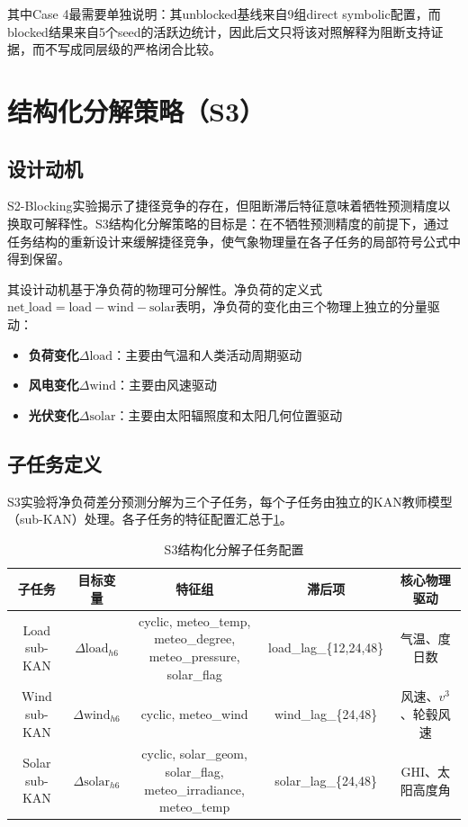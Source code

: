 其中Case 4最需要单独说明：其unblocked基线来自9组direct symbolic配置，而blocked结果来自5个seed的活跃边统计，因此后文只将该对照解释为阻断支持证据，而不写成同层级的严格闭合比较。

\section{结构化分解策略（S3）}
\label{sec:s3-design}

\subsection{设计动机}

S2-Blocking实验揭示了捷径竞争的存在，但阻断滞后特征意味着牺牲预测精度以换取可解释性。S3结构化分解策略的目标是：在不牺牲预测精度的前提下，通过任务结构的重新设计来缓解捷径竞争，使气象物理量在各子任务的局部符号公式中得到保留。

其设计动机基于净负荷的物理可分解性。净负荷的定义式$\text{net\_load} = \text{load} - \text{wind} - \text{solar}$表明，净负荷的变化由三个物理上独立的分量驱动：
\begin{itemize}
  \item \textbf{负荷变化}$\Delta\text{load}$：主要由气温和人类活动周期驱动
  \item \textbf{风电变化}$\Delta\text{wind}$：主要由风速驱动
  \item \textbf{光伏变化}$\Delta\text{solar}$：主要由太阳辐照度和太阳几何位置驱动
\end{itemize}

\subsection{子任务定义}

S3实验将净负荷差分预测分解为三个子任务，每个子任务由独立的KAN教师模型（sub-KAN）处理。各子任务的特征配置汇总于\cref{tab:s3-config}。

\begin{table}[htbp]
\centering
\caption{S3结构化分解子任务配置}
\label{tab:s3-config}
\begin{tabular}{ccccc}
\toprule
子任务 & 目标变量 & 特征组 & 滞后项 & 核心物理驱动 \\
\midrule
Load sub-KAN & $\Delta\text{load}_{h6}$ & \makecell{cyclic, meteo\_temp,\\meteo\_degree, meteo\_pressure,\\solar\_flag} & load\_lag\_\{12,24,48\} & 气温、度日数 \\
\addlinespace
Wind sub-KAN & $\Delta\text{wind}_{h6}$ & cyclic, meteo\_wind & wind\_lag\_\{24,48\} & 风速、$v^3$、轮毂风速 \\
\addlinespace
Solar sub-KAN & $\Delta\text{solar}_{h6}$ & \makecell{cyclic, solar\_geom,\\solar\_flag, meteo\_irradiance,\\meteo\_temp} & solar\_lag\_\{24,48\} & GHI、太阳高度角 \\
\bottomrule
\end{tabular}
\end{table}

